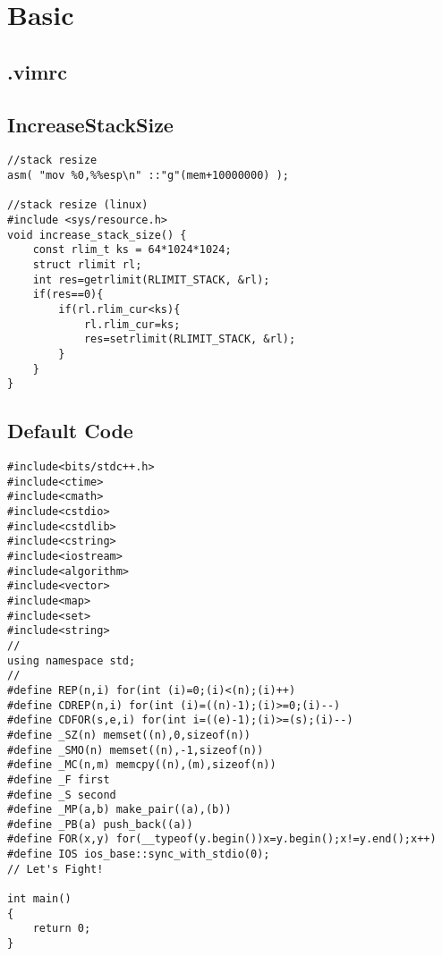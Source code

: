 \documentclass[10pt,twocolumn,oneside]{article}
\begin{document}
\pagestyle{fancy}
\fancyfoot{}
\fancyhead[R]{\thepage}
\renewcommand{\headrulewidth}{0.4pt}
\renewcommand{\contentsname}{Contents} 

\scriptsize
\tableofcontents
\section{Basic}
\subsection{.vimrc}




\subsection{IncreaseStackSize}
\begin{lstlisting}
//stack resize
asm( "mov %0,%%esp\n" ::"g"(mem+10000000) );

//stack resize (linux)
#include <sys/resource.h>
void increase_stack_size() {
	const rlim_t ks = 64*1024*1024;
	struct rlimit rl;
	int res=getrlimit(RLIMIT_STACK, &rl);
	if(res==0){
		if(rl.rlim_cur<ks){
			rl.rlim_cur=ks;
			res=setrlimit(RLIMIT_STACK, &rl);
		}
	}
}
\end{lstlisting}

\subsection{Default Code}
\begin{lstlisting}
#include<bits/stdc++.h>
#include<ctime>
#include<cmath>
#include<cstdio>
#include<cstdlib>
#include<cstring>
#include<iostream>
#include<algorithm>
#include<vector>
#include<map>
#include<set>
#include<string>
//
using namespace std;
//
#define REP(n,i) for(int (i)=0;(i)<(n);(i)++)
#define CDREP(n,i) for(int (i)=((n)-1);(i)>=0;(i)--)
#define CDFOR(s,e,i) for(int i=((e)-1);(i)>=(s);(i)--)
#define _SZ(n) memset((n),0,sizeof(n))
#define _SMO(n) memset((n),-1,sizeof(n))
#define _MC(n,m) memcpy((n),(m),sizeof(n))
#define _F first
#define _S second
#define _MP(a,b) make_pair((a),(b))
#define _PB(a) push_back((a))
#define FOR(x,y) for(__typeof(y.begin())x=y.begin();x!=y.end();x++)
#define IOS ios_base::sync_with_stdio(0);
// Let's Fight!

int main()
{
	return 0;
}

\end{lstlisting}
\newpage
\end{document}
